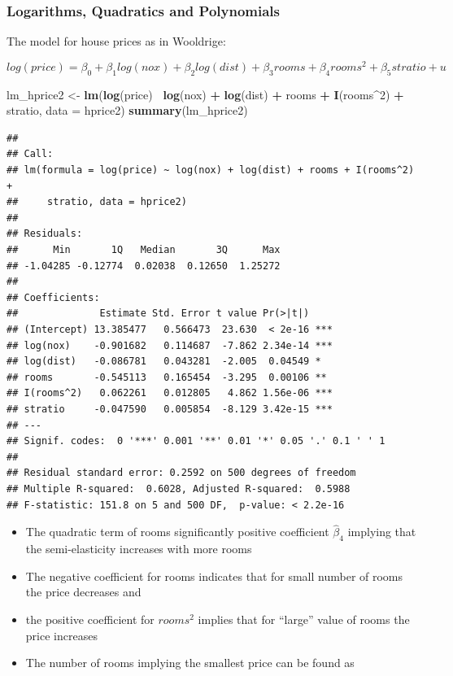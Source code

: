 \documentclass[]{book}
\newenvironment{Shaded}{\begin{snugshade}}{\end{snugshade}}
\newcommand{\DataTypeTok}[1]{\textcolor[rgb]{0.13,0.29,0.53}{#1}}
\newcommand{\DecValTok}[1]{\textcolor[rgb]{0.00,0.00,0.81}{#1}}
\newcommand{\KeywordTok}[1]{\textcolor[rgb]{0.13,0.29,0.53}{\textbf{#1}}}
\newcommand{\NormalTok}[1]{#1}
\newcommand{\OperatorTok}[1]{\textcolor[rgb]{0.81,0.36,0.00}{\textbf{#1}}}
\newcommand{\StringTok}[1]{\textcolor[rgb]{0.31,0.60,0.02}{#1}}
\providecommand{\tightlist}{%
  \setlength{\itemsep}{0pt}\setlength{\parskip}{0pt}}
\begin{document}
\hypertarget{logarithms-quadratics-and-polynomials}{%
\subsubsection{Logarithms, Quadratics and Polynomials}\label{logarithms-quadratics-and-polynomials}}

The model for house prices as in Wooldrige:

\begin{equation}
log(price) = \beta_0 +  \beta_1 log(nox) + \beta_2 log(dist) + \beta_3 rooms + \beta_4 rooms^{2} + \beta_5 stratio + u 
\end{equation}

\begin{Shaded}
\begin{Highlighting}[]
\NormalTok{lm_hprice2 <-}\StringTok{ }\KeywordTok{lm}\NormalTok{(}\KeywordTok{log}\NormalTok{(price)}\OperatorTok{~}\StringTok{  }\KeywordTok{log}\NormalTok{(nox) }\OperatorTok{+}\StringTok{  }\KeywordTok{log}\NormalTok{(dist) }\OperatorTok{+}\StringTok{ }\NormalTok{rooms }\OperatorTok{+}\StringTok{ }\KeywordTok{I}\NormalTok{(rooms}\OperatorTok{^}\DecValTok{2}\NormalTok{) }\OperatorTok{+}\StringTok{ }\NormalTok{stratio, }\DataTypeTok{data =}\NormalTok{ hprice2)}
\KeywordTok{summary}\NormalTok{(lm_hprice2)}
\end{Highlighting}
\end{Shaded}

\begin{verbatim}
## 
## Call:
## lm(formula = log(price) ~ log(nox) + log(dist) + rooms + I(rooms^2) + 
##     stratio, data = hprice2)
## 
## Residuals:
##      Min       1Q   Median       3Q      Max 
## -1.04285 -0.12774  0.02038  0.12650  1.25272 
## 
## Coefficients:
##              Estimate Std. Error t value Pr(>|t|)    
## (Intercept) 13.385477   0.566473  23.630  < 2e-16 ***
## log(nox)    -0.901682   0.114687  -7.862 2.34e-14 ***
## log(dist)   -0.086781   0.043281  -2.005  0.04549 *  
## rooms       -0.545113   0.165454  -3.295  0.00106 ** 
## I(rooms^2)   0.062261   0.012805   4.862 1.56e-06 ***
## stratio     -0.047590   0.005854  -8.129 3.42e-15 ***
## ---
## Signif. codes:  0 '***' 0.001 '**' 0.01 '*' 0.05 '.' 0.1 ' ' 1
## 
## Residual standard error: 0.2592 on 500 degrees of freedom
## Multiple R-squared:  0.6028, Adjusted R-squared:  0.5988 
## F-statistic: 151.8 on 5 and 500 DF,  p-value: < 2.2e-16
\end{verbatim}

\begin{itemize}
\tightlist
\item
  The quadratic term of rooms significantly positive coefficient \(\hat\beta_4\) implying that the semi-elasticity increases with more rooms
\item
  The negative coefficient for rooms indicates that for small number of rooms the price decreases and
\item
  the positive coefficient for \(rooms^2\) implies that for ``large'' value of rooms the price increases
\item
  The number of rooms implying the smallest price can be found as
\end{itemize}
\end{document}
